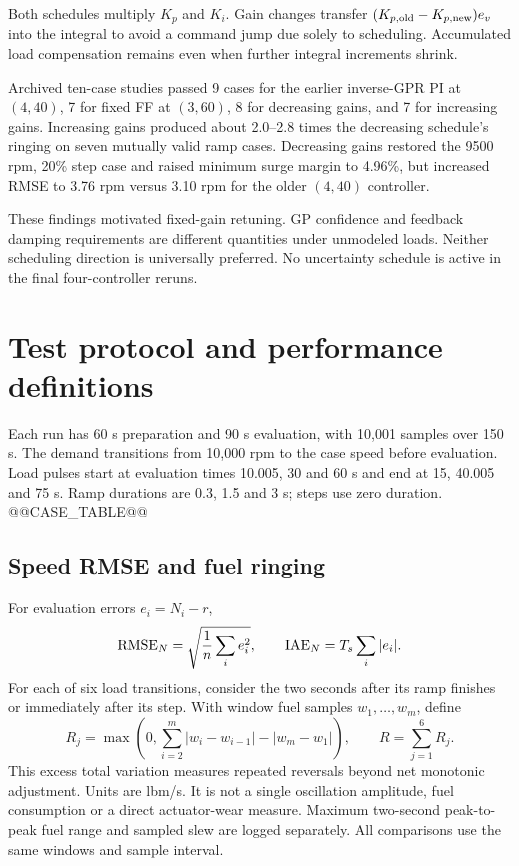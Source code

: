 Both schedules multiply $K_p$ and $K_i$. Gain changes transfer $(K_{p,\rm old}-K_{p,\rm new})e_v$ into the integral to avoid a command jump due solely to scheduling. Accumulated load compensation remains even when further integral increments shrink.

Archived ten-case studies passed 9 cases for the earlier inverse-GPR PI at $(4,40)$, 7 for fixed FF at $(3,60)$, 8 for decreasing gains, and 7 for increasing gains. Increasing gains produced about 2.0--2.8 times the decreasing schedule's ringing on seven mutually valid ramp cases. Decreasing gains restored the 9500 rpm, 20\% step case and raised minimum surge margin to 4.96\%, but increased RMSE to 3.76 rpm versus 3.10 rpm for the older $(4,40)$ controller.

These findings motivated fixed-gain retuning. GP confidence and feedback damping requirements are different quantities under unmodeled loads. Neither scheduling direction is universally preferred. No uncertainty schedule is active in the final four-controller reruns.

\section{Test protocol and performance definitions}
Each run has 60 s preparation and 90 s evaluation, with 10,001 samples over 150 s. The demand transitions from 10,000 rpm to the case speed before evaluation. Load pulses start at evaluation times 10.005, 30 and 60 s and end at 15, 40.005 and 75 s. Ramp durations are 0.3, 1.5 and 3 s; steps use zero duration.
@@CASE_TABLE@@

\subsection{Speed RMSE and fuel ringing}
For evaluation errors $e_i=N_i-r$,
\begin{equation}
{\rm RMSE}_N=\sqrt{\frac1n\sum_i e_i^2},\qquad {\rm IAE}_N=T_s\sum_i|e_i|.
\end{equation}
For each of six load transitions, consider the two seconds after its ramp finishes or immediately after its step. With window fuel samples $w_1,\ldots,w_m$, define
\begin{equation}
R_j=\max\left(0,\sum_{i=2}^m|w_i-w_{i-1}|-|w_m-w_1|\right),\qquad R=\sum_{j=1}^6R_j.
\label{eq:ring}
\end{equation}
This excess total variation measures repeated reversals beyond net monotonic adjustment. Units are lbm/s. It is not a single oscillation amplitude, fuel consumption or a direct actuator-wear measure. Maximum two-second peak-to-peak fuel range and sampled slew are logged separately. All comparisons use the same windows and sample interval.

